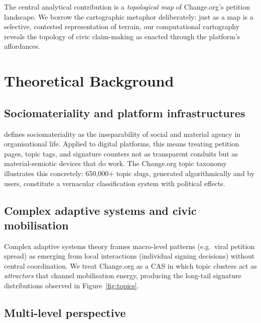 \documentclass[a4paper, justified, notoc, nobib]{tufte-handout}
\begin{document}
The central analytical contribution is a \emph{topological map} of
Change.org's petition landscape.
We borrow the cartographic metaphor deliberately: just as a map is a
selective, contested representation of terrain, our computational cartography
reveals the topology of civic claim-making as enacted through the platform's
affordances.

\section{Theoretical Background}

\subsection{Sociomateriality and platform infrastructures}

\textcite{orlikowski2007} defines sociomateriality as the inseparability of
social and material agency in organisational life.
Applied to digital platforms, this means treating petition pages, topic tags,
and signature counters not as transparent conduits but as material-semiotic
devices that do work.
The Change.org topic taxonomy illustrates this concretely: 650,000+ topic
slugs, generated algorithmically and by users, constitute a vernacular
classification system with political effects.

\subsection{Complex adaptive systems and civic mobilisation}

Complex adaptive systems theory \parencite{holland1992} frames macro-level
patterns (e.g.\ viral petition spread) as emerging from local interactions
(individual signing decisions) without central coordination.
We treat Change.org as a CAS in which topic clusters act as \emph{attractors}
that channel mobilisation energy, producing the long-tail signature
distributions observed in Figure~\ref{fig:topics}.

\subsection{Multi-level perspective}
\end{document}
